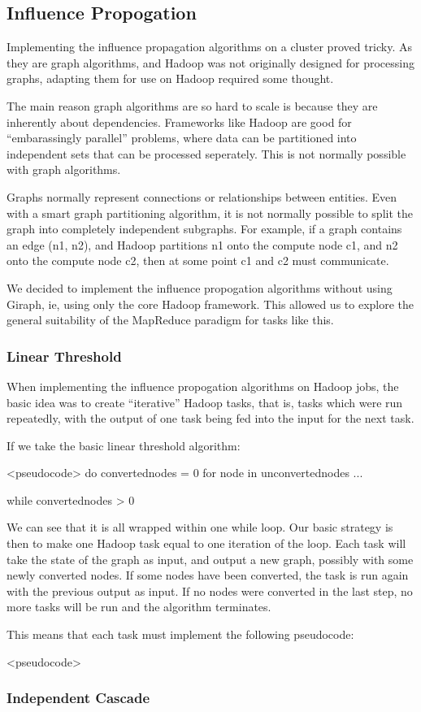 \subsection{Influence Propogation}
Implementing the influence propagation algorithms on a cluster proved tricky. As they are graph algorithms, and Hadoop was not originally designed for processing graphs, adapting them for use on Hadoop required some thought.

The main reason graph algorithms are so hard to scale is because they are inherently about dependencies. Frameworks like Hadoop are good for ``embarassingly parallel'' problems, where data can be partitioned into independent sets that can be processed seperately. This is not normally possible with graph algorithms. 

Graphs normally represent connections or relationships between entities. Even with a smart graph partitioning algorithm, it is not normally possible to split the graph into completely independent subgraphs. For example, if a graph contains an edge (n1, n2), and Hadoop partitions n1 onto the compute node c1, and n2 onto the compute node c2, then at some point c1 and c2 must communicate. 

We decided to implement the influence propogation algorithms without using Giraph, ie, using only the core Hadoop framework. This allowed us to explore the general suitability of the MapReduce paradigm for tasks like this. 

\subsubsection{Linear Threshold}

When implementing the influence propogation algorithms on Hadoop jobs, the basic idea was to create ``iterative'' Hadoop tasks, that is, tasks which were run repeatedly, with the output of one task being fed into the input for the next task.

If we take the basic linear threshold algorithm:

<pseudocode>
do
  convertednodes = 0
  for node in unconvertednodes
    ...

while convertednodes > 0

We can see that it is all wrapped within one while loop. Our basic strategy is then to make one Hadoop task equal to one iteration of the loop. Each task will take the state of the graph as input, and output a new graph, possibly with some newly converted nodes. If some nodes have been converted, the task is run again with the previous output as input. If no nodes were converted in the last step, no more tasks will be run and the algorithm terminates.

This means that each task must implement the following pseudocode:

<pseudocode>


\subsubsection{Independent Cascade}







